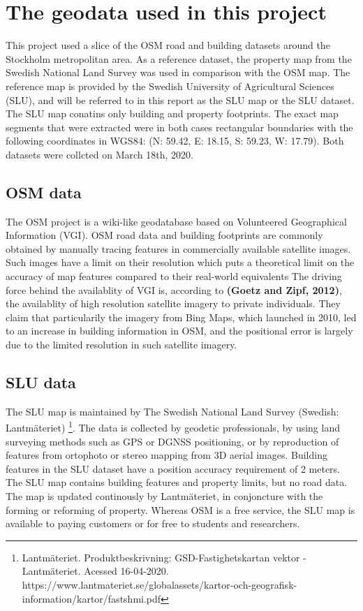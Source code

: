 \documentclass{kththesis}
\begin{document}
\section{The geodata used in this project}

This project used a slice of the OSM road and building datasets around the Stockholm metropolitan area.
As a reference dataset, the property map from the Swedish National Land Survey was used in comparison with the OSM map.
The reference map is provided by the Swedish University of Agricultural Sciences (SLU), and will be referred to in this report as the SLU map or the SLU dataset.
The SLU map conatins only building and property footprints.
The exact map segments that were extracted were in both cases rectangular boundaries with the following coordinates in WGS84: (N: 59.42, E: 18.15, S: 59.23, W: 17.79).
Both datasets were collcted on March 18th, 2020.

\subsection{OSM data}

The OSM project is a wiki-like geodatabase based on Volunteered Geographical Information (VGI).
OSM road data and building footprints are commonly obtained by manually tracing features in commercially available satellite images.
Such images have a limit on their resolution which puts a theoretical limit on the accuracy of map features compared to their real-world equivalents
The driving force behind the availablity of VGI is, according to \textbf{(Goetz and Zipf, 2012)}, the availablity of high resolution satellite imagery to private individuals.
They claim that particularily the imagery from Bing Maps, which launched in 2010, led to an increase in building information in OSM, and the positional error is largely due to the limited resolution in such satellite imagery.

\subsection{SLU data}

The SLU map is maintained by The Swedish National Land Survey (Swedish: Lantmäteriet)
\footnote{Lantmäteriet. Produktbeskrivning: GSD-Fastighetskartan vektor - Lantmäteriet. Acessed 16-04-2020. https://www.lantmateriet.se/globalassets/kartor-och-geografisk-information/kartor/fastshmi.pdf}.
The data is collected by geodetic professionals, by using land surveying methods such as GPS or DGNSS positioning, or by reproduction of features from ortophoto or stereo mapping from 3D aerial images.
Building features in the SLU dataset have a position accuracy requirement of 2 meters.
The SLU map contains building features and property limits, but no road data.
The map is updated continously by Lantmäteriet, in conjoncture with the forming or reforming of property.
Whereas OSM is a free service, the SLU map is available to paying customers or for free to students and researchers.
\end{document}
